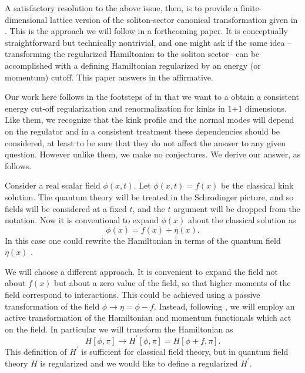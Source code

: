 \def\letter{0}\def\pr{0}\documentclass[a4paper,12pt, epsfig]{article}
\renewcommand{\(}{\begin{equation}}
\renewcommand{\)}{end{equation} \vspace{-.05in}\linebreak}
\renewcommand{\=}{\hspace{-.03in}=\hspace{-.02in}}
\renewcommand{\(}{\begin{equation}}
\renewcommand{\)}{\end{equation}}
\newcommand{\p}{^\prime}
\renewcommand{\(}{\begin{equation}}
\renewcommand{\)}{\end{equation}}
\newcommand{\beq}{\begin{equation}}
\newcommand{\eeq}{\end{equation}}
\begin{document}
A satisfactory resolution to the above issue, then, is to provide a finite-dimensional lattice version of the soliton-sector canonical transformation given in \cite{gjs,Tomboulis:1975gf}.  This is the approach we will follow in a forthcoming paper.  It is conceptually straightforward but technically nontrivial, and one might ask if the same idea --transforming the regularized Hamiltonian to the soliton sector-- can be accomplished with a defining Hamiltonian regularized by an energy (or momentum) cutoff.  This paper answers in the affirmative.

Our work here follows in the footsteps of \cite{lit} in that we want to a obtain a consistent energy cut-off regularization and renormalization for kinks in 1+1 dimensions.  Like them, we recognize that the kink profile and the normal modes will depend on the regulator and in a consistent treatment these dependencies  should be considered, at least to be sure that they do not affect the answer to any given question.  However unlike them, we make no conjectures.  We derive our answer, as follows.

Consider a real scalar field $\phi(x,t)$.  Let $\phi(x,t)=f(x)$ be the classical kink solution.  The quantum theory will be treated in the Schrodinger picture, and so fields will be considered at a fixed $t$, and the $t$ argument will be dropped from the notation.  Now it is conventional to expand $\phi(x)$ about the classical solution as
\beq
\phi(x)=f(x)+\eta(x).
\eeq
In this case one could rewrite the Hamiltonian in terms of the quantum field $\eta(x)$ \cite{cahill76}.  

We will choose a different approach.  It is convenient to expand the field not about $f(x)$ but about a zero value of the field, {so that higher moments of the field correspond to interactions}.  This could be achieved using a passive transformation of the field $\phi\rightarrow \eta=\phi-f$.  Instead, following \cite{dhn2}, we will employ an active transformation of the Hamiltonian and momentum functionals which act on the field.  In particular we will transform the Hamiltonian as
\beq
H[\phi,\pi]\rightarrow H\p[\phi,\pi]=H[\phi+f,\pi]. \label{hpt}
\eeq
This definition of $H\p$ is sufficient for classical field theory, but in quantum field theory $H$ is regularized and we would like to define a regularized $H\p$.
\end{document}
